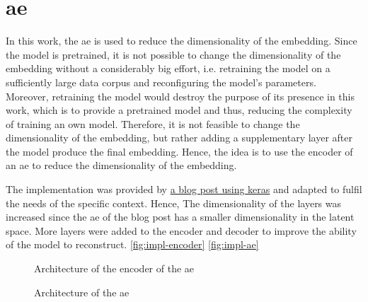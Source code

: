 \section{\acl{ae}}\label{subsec:impl-autoencoder}

In this work, the \ac{ae} is used to reduce the dimensionality of the \infersent{} embedding.
Since the \infersent{} model is pretrained, it is not possible to change the dimensionality of the embedding without a considerably big effort,
i.e. retraining the model on a sufficiently large data corpus and reconfiguring the model's parameters.
Moreover, retraining the model would destroy the purpose of its presence in this work, which is to provide a pretrained model and thus, 
reducing the complexity of training an own model.
Therefore, it is not feasible to change the dimensionality of the \infersent{} embedding, but rather adding a supplementary layer after the model 
produce the final embedding.
Hence, the idea is to use the encoder of an \ac{ae} to reduce the dimensionality of the \infersent{} embedding.

The implementation was provided by 
\href{https://blog.paperspace.com/autoencoder-image-compression-keras/}{a blog post using keras}
and adapted to fulfil the needs of the specific context.
Hence, The dimensionality of the layers was increased since the \ac{ae} of the blog post has a smaller dimensionality in the latent space.
More layers were added to the encoder and decoder to improve the ability of the model to reconstruct.
\autoref{fig:impl-encoder} \autoref{fig:impl-ae}

\begin{figure}[h] %
    \centering
    
    \caption{Architecture of the encoder of the \ac{ae}}
    \label{fig:impl-encoder}
\end{figure}

\begin{figure}[h] %
    \centering
    
    \caption{Architecture of the \ac{ae}}
    \label{fig:impl-ae}
\end{figure}